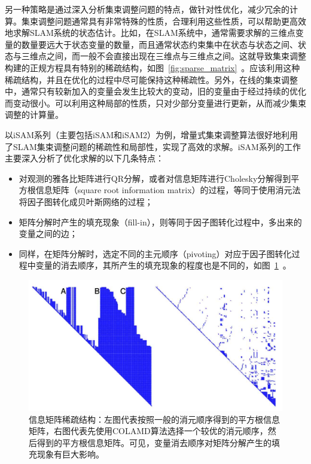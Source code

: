 另一种策略是通过深入分析集束调整问题的特点，做针对性优化，减少冗余的计算。集束调整问题通常具有非常特殊的性质，合理利用这些性质，可以帮助更高效地求解SLAM系统的状态估计。比如，在SLAM系统中，通常需要求解的三维点变量的数量要远大于状态变量的数量，而且通常状态约束集中在状态与状态之间、状态与三维点之间，而一般不会直接出现在三维点与三维点之间。这就导致集束调整构建的正规方程具有特别的稀疏结构，如图~\ref{fig:sparse_matrix}~。应该利用这种稀疏结构，并且在优化的过程中尽可能保持这种稀疏性。另外，在线的集束调整中，通常只有较新加入的变量会发生比较大的变动，旧的变量由于经过持续的优化而变动很小。可以利用这种局部的性质，只对少部分变量进行更新，从而减少集束调整的计算量。

以iSAM系列（主要包括iSAM\citep{kaess2008isam}和iSAM2\citep{kaess2012isam2}）为例，增量式集束调整算法很好地利用了SLAM集束调整问题的稀疏性和局部性，实现了高效的求解。iSAM系列的工作主要深入分析了优化求解的以下几条特点：
\begin{itemize}
    \item 对观测的雅各比矩阵进行QR分解，或者对信息矩阵进行Cholesky分解得到平方根信息矩阵（square root information matrix）的过程，等同于使用消元法将因子图转化成贝叶斯网络的过程；
    \item 矩阵分解时产生的填充现象（fill-in），则等同于因子图转化过程中，多出来的变量之间的边；
    \item 同样，在矩阵分解时，选定不同的主元顺序（pivoting）对应于因子图转化过程中变量的消去顺序，其所产生的填充现象的程度也是不同的，如图~\ref{fig:fill_in}~。
\end{itemize}

\begin{figure}[htb!]
    \centering
    \includegraphics[width=.8\textwidth]{Pictures/sparse_pattern.png}
    \caption{信息矩阵稀疏结构\citep{kaess2008isam}：左图代表按照一般的消元顺序得到的平方根信息矩阵，右图代表先使用COLAMD算法选择一个较优的消元顺序，然后得到的平方根信息矩阵。可见，变量消去顺序对矩阵分解产生的填充现象有巨大影响。}
    \label{fig:fill_in}
\end{figure}

